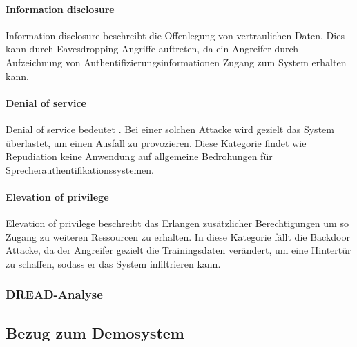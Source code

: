 \paragraph{Information disclosure}
Information disclosure beschreibt die Offenlegung von vertraulichen Daten.
Dies kann durch Eavesdropping Angriffe auftreten, da ein Angreifer durch Aufzeichnung von Authentifizierungsinformationen Zugang zum System erhalten kann.

\paragraph{Denial of service}
Denial of service bedeutet .
Bei einer solchen Attacke wird gezielt das System überlastet, um einen Ausfall zu provozieren.
Diese Kategorie findet wie Repudiation keine Anwendung auf allgemeine Bedrohungen für Sprecherauthentifikationssystemen.

\paragraph{Elevation of privilege}
Elevation of privilege beschreibt das Erlangen zusätzlicher Berechtigungen um so Zugang zu weiteren Ressourcen zu erhalten.
In diese Kategorie fällt die Backdoor Attacke, da der Angreifer gezielt die Trainingsdaten verändert, um eine Hintertür zu schaffen, sodass er das System infiltrieren kann.



\subsubsection{DREAD-Analyse}


\subsection{Bezug zum Demosystem}


































































